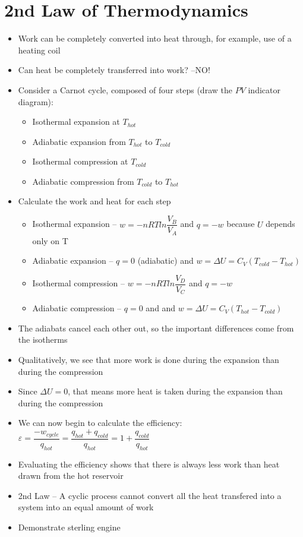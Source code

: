 \documentclass[12pt, openany, letterpaper]{memoir}
\begin{document}
\section*{2nd Law of Thermodynamics}
\begin{itemize}
	\item Work can be completely converted into heat through, for example, use of a heating coil
	\item Can heat be completely transferred into work? --{\large NO!}
	\item Consider a Carnot cycle, composed of four steps (draw the $PV$ indicator diagram):
	\begin{itemize}
		\item Isothermal expansion at $T_{hot}$
		\item Adiabatic expansion from $T_{hot}$ to $T_{cold}$
		\item Isothermal compression at $T_{cold}$
		\item Adiabatic compression from $T_{cold}$ to $T_{hot}$
	\end{itemize}
	\item Calculate the work and heat for each step
	\begin{itemize}
		\item Isothermal expansion -- $w = -nRTln\dfrac{V_B}{V_A}$ and $q = -w$ because $U$ depends only on T
		\item Adiabatic expansion -- $q=0$ (adiabatic) and $w = \Delta U = C_V(T_{cold}-T_{hot})$
		\item Isothermal compression -- $w = -nRTln\dfrac{V_D}{V_C}$ and $q = -w$
		\item Adiabatic compression -- $q=0$ and and $w = \Delta U = C_V(T_{hot}-T_{cold})$
	\end{itemize}
	\item The adiabats cancel each other out, so the important differences come from the isotherms
	\item Qualitatively, we see that more work is done during the expansion than during the compression
	\item Since $\Delta U=0$, that means more heat is taken  during the expansion than during the compression
	\item We can now begin to calculate the efficiency: $\varepsilon = \dfrac{-w_{cycle}}{q_{hot}} = \dfrac{q_{hot}+q_{cold}}{q_{hot}} = 1+\dfrac{q_{cold}}{q_{hot}}$
	\item Evaluating the efficiency shows that there is always less work than heat drawn from the hot reservoir
	\item 2nd Law -- A cyclic process cannot convert all the heat transfered into a system into an equal amount of work
	\item Demonstrate sterling engine
\end{itemize}
\end{document}
